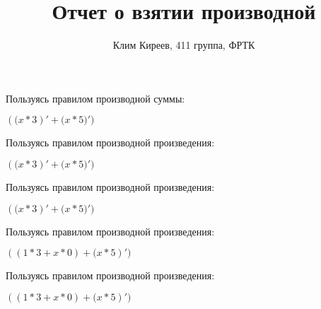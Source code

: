\documentclass[a4paper,20pt]{article}
\title{Отчет о взятии производной}
\author{Клим Киреев, 411 группа, ФРТК}
\date{}
\begin{document}
	\maketitle
	\newpage
Пользуясь правилом производной суммы:

${({({x}*{3}})'+{({x}*{5}})')}$

Пользуясь правилом производной произведения:

${({({x}*{3}})'+{({x}*{5}})')}$

Пользуясь правилом производной произведения:

${({({x}*{3}})'+{({x}*{5}})')}$

Пользуясь правилом производной произведения:

${({({{1}*{3}}+{{x}*{0}})}+{({x}*{5}})')}$

Пользуясь правилом производной произведения:

${({({{1}*{3}}+{{x}*{0}})}+{({x}*{5}})')}$
\end{document}
